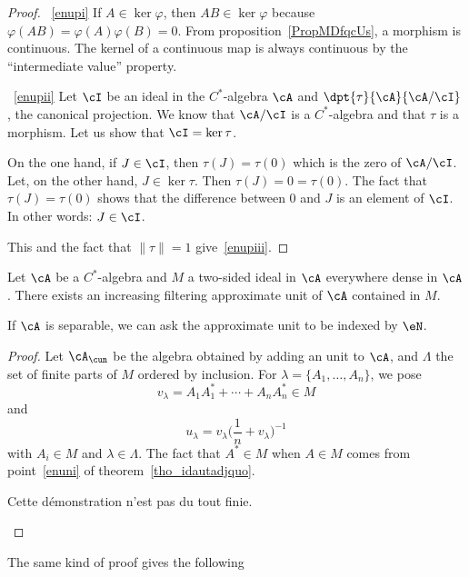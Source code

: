 \begin{proof}
	~\ref{enupi} If $A\in\ker\varphi$, then $AB\in\ker\varphi$ because $\varphi(AB)=\varphi(A)\varphi(B)=0$. From proposition~\ref{PropMDfqcUs}, a morphism is continuous. The kernel of a continuous map is always continuous by the ``intermediate value'' property.

	~\ref{enupii} Let $\cI$ be an ideal in the $C^*$-algebra $\cA$ and $\dpt{\tau}{\cA}{\cA/\cI}$, the canonical projection. We know that $\cA/\cI$ is a $C^*$-algebra and that $\tau$ is a morphism. Let us show that $\cI=\ker\tau$.

	On the one hand, if $J\in\cI$, then $\tau(J)=\tau(0)$ which is the zero of $\cA/\cI$. Let, on the other hand, $J\in\ker\tau$. Then $\tau(J)=0=\tau(0)$. The fact that $\tau(J)=\tau(0)$ shows that the difference between $0$ and $J$ is an element of $\cI$. In other words: $J\in\cI$.

	This and the fact that $\| \tau \|=1$ give~\ref{enupiii}.
\end{proof}


\begin{proposition}
	Let $\cA$ be a $C^*$-algebra  and $M$ a two-sided ideal in $\cA$ everywhere dense in $\cA$. There exists an increasing filtering approximate unit of $\cA$ contained in $M$.

	If $\cA$ is separable, we can ask the approximate unit to be indexed by $\eN$.

\end{proposition}
\begin{proof}
	Let $\cA_{\cun}$ be the algebra obtained by adding an unit to $\cA$, and $\Lambda$ the set of finite parts of $M$ ordered by inclusion. For $\lambda=\{ A_1,\ldots, A_n \}$, we pose
	\[
		v_{\lambda}=A_1A_1^*+\cdots+A_nA_n^*\in M
	\]
	and
	\[
		u_{\lambda}=v_{\lambda}\big( \frac{1}{ n }+v_{\lambda} \big)^{-1}
	\]
	with $A_i\in M$ and $\lambda\in\Lambda$. The fact that $A^*\in M$ when $A\in M$ comes from point~\ref{enuni} of theorem~\ref{tho_idautadjquo}.

	\begin{probleme}
		Cette démonstration n'est pas du tout finie.
	\end{probleme}

\end{proof}

The same kind of proof gives the following

